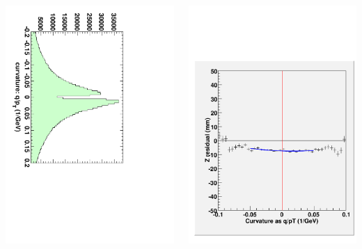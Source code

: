\documentclass[compress]{beamer}
\begin{document}
\begin{frame}
\begin{columns}
\includegraphics[height=\linewidth, angle=90]{qoverpt.pdf}

\includegraphics[width=\linewidth]{oprof_whm2_withcut.pdf}


\end{columns}
\end{frame}
\end{document}
